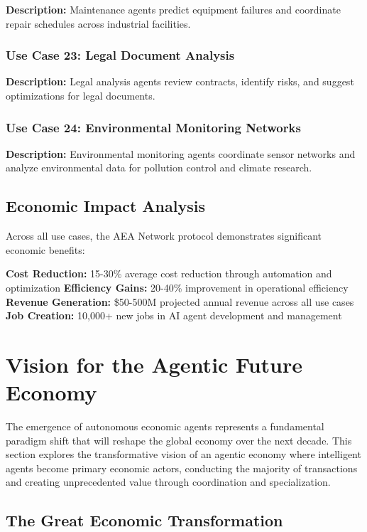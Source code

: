 \documentclass[12pt,a4paper]{article}
\begin{document}
\textbf{Description:} Maintenance agents predict equipment failures and coordinate repair schedules across industrial facilities.

\subsubsection{Use Case 23: Legal Document Analysis}

\textbf{Description:} Legal analysis agents review contracts, identify risks, and suggest optimizations for legal documents.

\subsubsection{Use Case 24: Environmental Monitoring Networks}

\textbf{Description:} Environmental monitoring agents coordinate sensor networks and analyze environmental data for pollution control and climate research.

\subsection{Economic Impact Analysis}

Across all use cases, the AEA Network protocol demonstrates significant economic benefits:

\textbf{Cost Reduction:} 15-30\% average cost reduction through automation and optimization
\textbf{Efficiency Gains:} 20-40\% improvement in operational efficiency
\textbf{Revenue Generation:} \$50-500M projected annual revenue across all use cases
\textbf{Job Creation:} 10,000+ new jobs in AI agent development and management

\section{Vision for the Agentic Future Economy}

The emergence of autonomous economic agents represents a fundamental paradigm shift that will reshape the global economy over the next decade. This section explores the transformative vision of an agentic economy where intelligent agents become primary economic actors, conducting the majority of transactions and creating unprecedented value through coordination and specialization.

\subsection{The Great Economic Transformation}
\end{document}
